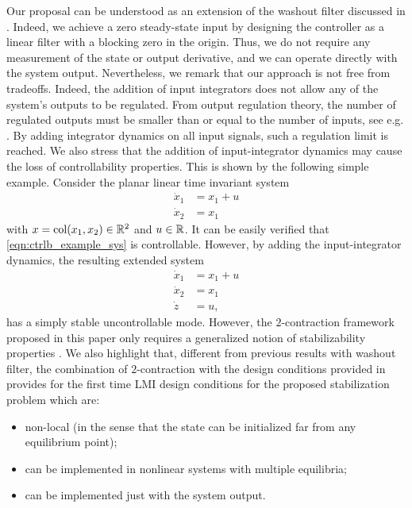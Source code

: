 \documentclass{ifacconf}
\begin{document}
Our proposal can be understood as an extension of the washout filter discussed in \citep{GARRARD1977497, WANG19951213, Hassouneh2004}. Indeed, we achieve a zero steady-state input by designing the controller as a linear filter with a blocking zero in the origin. Thus, we do not require any measurement of the state or output derivative, and we can operate directly with the system output. 
Nevertheless, we remark that our approach is not free from tradeoffs. Indeed, the addition of input integrators does not allow any of the system's outputs to be regulated. From output regulation theory, the number of regulated outputs must be smaller than or equal to the number of inputs, see e.g. \citep{isidori2003robust}. By adding integrator dynamics on all input signals, such a regulation limit is reached.
We also stress that the addition of input-integrator dynamics may cause the loss of controllability properties. This is shown by the following simple example.
Consider the planar linear time invariant system
\begin{equation}
    \label{eqn:ctrlb_example_sys}
    \begin{array}{rl}
     \dot x_1&= x_1+u  \\
     \dot x_2 &= x_1 
\end{array}
\end{equation}
with $x=\operatorname{col}(x_1,x_2)\in{\mathbb{R}}^2$ and $u\in{\mathbb{R}}$. It can be easily verified that \eqref{eqn:ctrlb_example_sys} is controllable. However, by adding the input-integrator dynamics, the resulting extended system
\[
    \begin{array}{rl}
     \dot x_1&= x_1+u  \\
     \dot x_2 &= x_1 \\
     \dot z &= u,
\end{array}
\]
has a simply stable uncontrollable mode. However, the $2$-contraction framework proposed in this paper only requires a generalized notion of stabilizability properties \citep{cecilia2023generalized}.
We also highlight that, different from previous results with washout filter, the combination of $2$-contraction \citep{cecilia2023generalized} with the design conditions provided in \citep{zoboli2024dynamic} provides for the first time LMI design conditions for the proposed stabilization problem which are:
\begin{itemize}
    \item non-local (in the sense that the state can be initialized far from any equilibrium point);
    \item can be implemented in nonlinear systems with multiple equilibria;
    \item can be implemented just with the system output.
\end{itemize}
\end{document}

